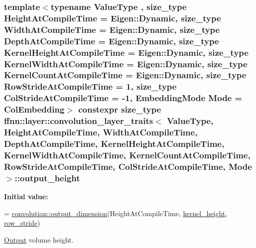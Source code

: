 \hypertarget{structffnn_1_1layer_1_1convolution__layer__traits_a352db60c55310a92c32b68ecec8967db}{
\subsubsection[{output\-\_\-height}]{\setlength{\rightskip}{0pt plus 5cm}template$<$typename Value\-Type , size\-\_\-type Height\-At\-Compile\-Time = Eigen\-::\-Dynamic, size\-\_\-type Width\-At\-Compile\-Time = Eigen\-::\-Dynamic, size\-\_\-type Depth\-At\-Compile\-Time = Eigen\-::\-Dynamic, size\-\_\-type Kernel\-Height\-At\-Compile\-Time = Eigen\-::\-Dynamic, size\-\_\-type Kernel\-Width\-At\-Compile\-Time = Eigen\-::\-Dynamic, size\-\_\-type Kernel\-Count\-At\-Compile\-Time = Eigen\-::\-Dynamic, size\-\_\-type Row\-Stride\-At\-Compile\-Time = 1, size\-\_\-type Col\-Stride\-At\-Compile\-Time = -\/1, Embedding\-Mode Mode = Col\-Embedding$>$ constexpr {\bf size\-\_\-type} {\bf ffnn\-::layer\-::convolution\-\_\-layer\-\_\-traits}$<$ Value\-Type, Height\-At\-Compile\-Time, Width\-At\-Compile\-Time, Depth\-At\-Compile\-Time, Kernel\-Height\-At\-Compile\-Time, Kernel\-Width\-At\-Compile\-Time, Kernel\-Count\-At\-Compile\-Time, Row\-Stride\-At\-Compile\-Time, Col\-Stride\-At\-Compile\-Time, Mode $>$\-::output\-\_\-height\hspace{0.3cm}{\ttfamily [static]}}}\label{structffnn_1_1layer_1_1convolution__layer__traits_a352db60c55310a92c32b68ecec8967db}
{\bfseries Initial value\-:}
\begin{DoxyCode}
=
    \hyperlink{namespaceffnn_1_1layer_1_1convolution_aca263840b789df041d868a8a87dbf36a}{convolution::output\_dimension}(HeightAtCompileTime, 
      \hyperlink{structffnn_1_1layer_1_1convolution__layer__traits_ad6fb939fee90c196d31a8c98f663caa3}{kernel\_height}, \hyperlink{structffnn_1_1layer_1_1convolution__layer__traits_a6b62abb46818fb4d09b096e53089b4f4}{row\_stride})
\end{DoxyCode}


\hyperlink{classffnn_1_1layer_1_1_output}{Output} volume height. 

